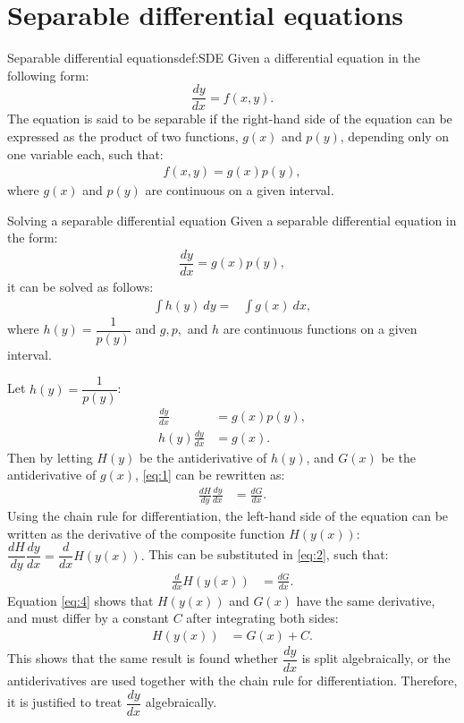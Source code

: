 \section{Separable differential equations}\label{SepDiff}
\begin{definition}{Separable differential equations}{def:SDE}
Given a differential equation in the following form: 
$$\frac{dy}{dx} = f(x,y).$$
The equation is said to be separable if the right-hand side of the equation can be expressed as the product of two functions, $g(x)$ and $p(y)$, depending only on one variable each, such that:
\begin{align*}
f(x,y)=g(x)p(y),
\end{align*}
where $g(x)$ and $p(y)$ are continuous on a given interval.
\end{definition}
\noindent
\begin{theorem}{Solving a separable differential equation}{}
Given a separable differential equation in the form:
\begin{align}
\dfrac{dy}{dx}=g(x)p(y), \label{SDEG}
\end{align}
it can be solved as follows:
\begin{align*}
\int h(y)\ dy =&\int g(x)\ dx,
\end{align*}
where $h(y)=\dfrac{1}{p(y)}$ and $g, p,$ and $h$ are continuous functions on a given interval.
\end{theorem}
\begin{justification}{}{}
Let $h(y) = \dfrac{1}{p(y)}$:
 \begin{align}
	\frac{dy}{dx} &= g(x)p(y), \nonumber\\
	h(y)\frac{dy}{dx} &= g(x). \label{eq:1}
 \end{align}
Then by letting $H(y)$ be the antiderivative of $h(y)$, and $G(x)$ be the antiderivative of $g(x)$, \eqref{eq:1} can be rewritten as: 
 \begin{align}
 	\frac{dH}{dy}\frac{dy}{dx} &= \frac{dG}{dx}. \label{eq:2}
 \end{align}
Using the chain rule for differentiation, the left-hand side of the equation can be written as the derivative of the composite function $H \left(y(x) \right)$: $\dfrac{dH}{dy}\dfrac{dy}{dx} =\dfrac{d}{dx} H \left(y(x) \right).$ This can be substituted in \eqref{eq:2}, such that:
 \begin{align}
 	\frac{d}{dx}H\left(y(x)\right) &= \frac{dG}{dx}\label{eq:4}.
 \end{align}
Equation \eqref{eq:4} shows that $H\left(y(x)\right)$ and $G(x)$ have the same derivative, and must differ by a constant $C$ after integrating both sides:
 \begin{align*}
 	H\left(y(x)\right) &= G(x) + C.
 \end{align*}
This shows that the same result is found whether $\dfrac{dy}{dx}$ is split algebraically, or the antiderivatives are used together with the chain rule for differentiation. Therefore, it is justified to treat $\dfrac{dy}{dx}$ algebraically.
\end{justification}

